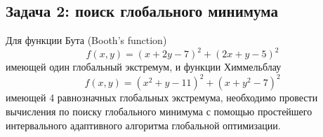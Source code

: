\subsection{Задача 2: поиск глобального минимума}

Для функции Бута (Booth's function)
\begin{equation}
	f(x, y) = (x + 2y - 7)^{2} + (2x + y - 5)^{2} 
\end{equation}
имеющей один глобальный экстремум, и функции Химмельблау
\begin{equation}
	f(x, y) = (x^{2} + y - 11)^{2} + (x + y^{2} - 7)^{2} 
\end{equation}
имеющей 4 равнозначных глобальных экстремума, необходимо провести вычисления по поиску глобального минимума с помощью простейшего интервального адаптивного алгоритма глобальной оптимизации.